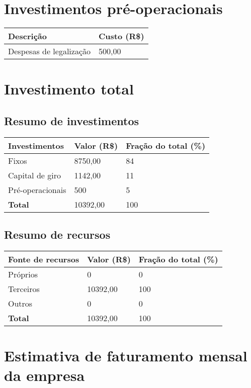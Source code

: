 \section{Investimentos pré-operacionais}

\begin{tabular}{| l | l |}
  \hline
  \textbf{Descrição} & \textbf{Custo (R\$)}\\ \hline
  Despesas de legalização & 500,00\\ \hline        
\end{tabular}
  
\section{Investimento total}

  \subsection{Resumo de investimentos}
  
  \begin{tabular}{| l | l | l |}
    \hline
    \textbf{Investimentos} & \textbf{Valor (R\$)} & \textbf{Fração do total} (\%)\\ \hline
    Fixos & 8750,00 & 84\\ \hline
    Capital de giro & 1142,00 & 11\\ \hline
    Pré-operacionais & 500 & 5\\ \hline
    \textbf{Total} & 10392,00 & 100\\ \hline
  \end{tabular}
  
  \subsection{Resumo de recursos}
  
  \begin{tabular}{| l | l | l |}
    \hline
    \textbf{Fonte de recursos} & \textbf{Valor (R\$)} & \textbf{Fração do total} (\%)\\ \hline
    Próprios & 0 & 0\\ \hline
    Terceiros & 10392,00 & 100\\ \hline
    Outros & 0 & 0\\ \hline
    \textbf{Total} & 10392,00 & 100\\ \hline
  \end{tabular}
  
\section{Estimativa de faturamento mensal da empresa}

